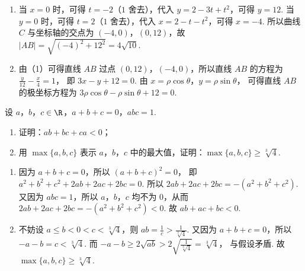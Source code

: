 \begin{solution}
\begin{enumerate}
\item 当 \(x=0\) 时，可得 \(t=-2\)（\(1\) 舍去），代入 \(y=2-3t+t^2\)，可得 \(y=12\).
当 \(y=0\) 时，可得 \(t=2\)（\(1\) 舍去），代入 \(x=2-t-t^2\)，可得 \(x=-4\).
所以曲线 \(C\) 与坐标轴的交点为 \((-4,0)\)，\((0,12)\)，故
\(|AB|=\sqrt{(-4)^2+12^2}=4\sqrt{10}\).

\item 由（1）可得直线 \(AB\) 过点 \((0,12)\)，\((-4,0)\)，所以直线 \(AB\) 的方程为
\(\frac{y}{12}-\frac{x}{4}=1\)，
即
\(3x-y+12=0\).
由
\(x=\rho\cos\theta\)，\(y=\rho\sin\theta\)，
可得直线 \(AB\) 的极坐标方程为
\(3\rho\cos\theta-\rho\sin\theta+12=0\).
\end{enumerate}
\end{solution}

\begin{problem}
设 \(a\)，\(b\)，\(c\in \R\)，\(a+b+c=0\)，\(abc=1\).

\begin{enumerate}
\item 证明：\(ab+bc+ca<0\)；
\item 用 \(\max\{a,b,c\}\) 表示 \(a\)，\(b\)，\(c\) 中的最大值，证明：\(\max\{a,b,c\}\ge \sqrt[3]{4}\).
\end{enumerate}
\end{problem}

\begin{solution}
\begin{enumerate}
\item 因为 \(a+b+c=0\)，所以
\((a+b+c)^2=0\)，
即
\(a^2+b^2+c^2+2ab+2ac+2bc=0\).
所以
\(2ab+2ac+2bc=-(a^2+b^2+c^2)\).
又因为 \(abc=1\)，所以 \(a\)，\(b\)，\(c\) 均不为 \(0\)，从而
\(2ab+2ac+2bc=-(a^2+b^2+c^2)<0\).
故
\(ab+ac+bc<0\).

\item 不妨设 \(a\le b<0<c<\sqrt[3]{4}\)，则
\(ab=\frac{1}{c}>\frac{1}{\sqrt[3]{4}}\).
又因为 \(a+b+c=0\)，所以
\(-a-b=c<\sqrt[3]{4}\).
而
\(-a-b\ge2\sqrt{ab}>2\sqrt{\frac{1}{\sqrt[3]{4}}}=\sqrt[3]{4}\)，
与假设矛盾.
故
\(\max\{a,b,c\}\ge \sqrt[3]{4}\).
\end{enumerate}
\end{solution}
